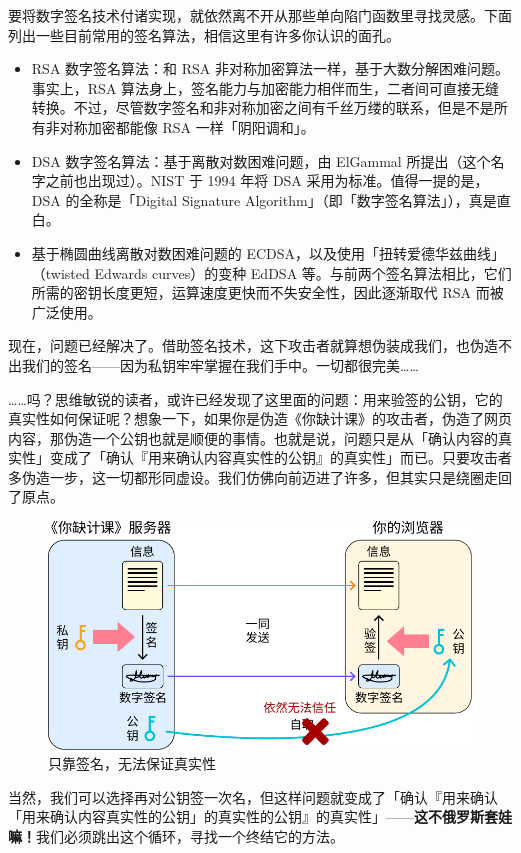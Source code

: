 要将数字签名技术付诸实现，就依然离不开从那些单向陷门函数里寻找灵感。下面列出一些目前常用的签名算法，相信这里有许多你认识的面孔。

\begin{itemize}
  \item RSA 数字签名算法：和 RSA 非对称加密算法一样，基于大数分解困难问题。事实上，RSA 算法身上，签名能力与加密能力相伴而生，二者间可直接无缝转换。不过，尽管数字签名和非对称加密之间有千丝万缕的联系，但是不是所有非对称加密都能像 RSA 一样「阴阳调和」。
  \item DSA 数字签名算法：基于离散对数困难问题，由 ElGammal 所提出（这个名字之前也出现过）。NIST 于 1994 年将 DSA 采用为标准。值得一提的是，DSA 的全称是「Digital Signature Algorithm」（即「数字签名算法」），真是直白。
  \item 基于椭圆曲线离散对数困难问题的 ECDSA，以及使用「扭转爱德华兹曲线」（twisted Edwards curves）的变种 EdDSA 等。与前两个签名算法相比，它们所需的密钥长度更短，运算速度更快而不失安全性，因此逐渐取代 RSA 而被广泛使用。
\end{itemize}

现在，问题已经解决了。借助签名技术，这下攻击者就算想伪装成我们，也伪造不出我们的签名——因为私钥牢牢掌握在我们手中。一切都很完美……

……吗？思维敏锐的读者，或许已经发现了这里面的问题：用来验签的公钥，它的真实性如何保证呢？想象一下，如果你是伪造《你缺计课》的攻击者，伪造了网页内容，那伪造一个公钥也就是顺便的事情。也就是说，问题只是从「确认内容的真实性」变成了「确认『用来确认内容真实性的公钥』的真实性」而已。只要攻击者多伪造一步，这一切都形同虚设。我们仿佛向前迈进了许多，但其实只是绕圈走回了原点。

\begin{figure}[htb!]
  \centering
  \includegraphics[width=.62\textwidth]{assets/surpass/Signing_invalid.pdf}
  \caption{只靠签名，无法保证真实性}
  \label{fig:Signing_invalid}
\end{figure}

\begin{note}
  当然，我们可以选择再对公钥签一次名，但这样问题就变成了「确认『用来确认「用来确认内容真实性的公钥」的真实性的公钥』的真实性」——\textbf{这不俄罗斯套娃嘛！}我们必须跳出这个循环，寻找一个终结它的方法。
\end{note}

